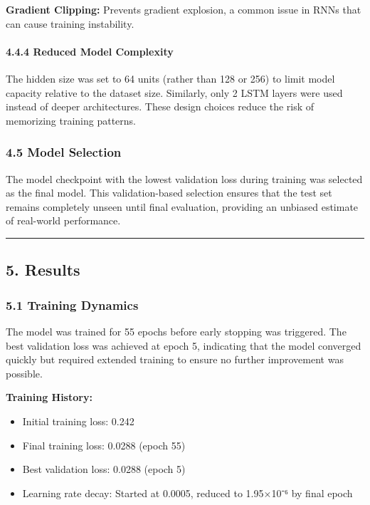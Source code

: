 \documentclass[
]{article}
\begin{document}
\textbf{Gradient Clipping:} Prevents gradient explosion, a common issue
in RNNs that can cause training instability.

\paragraph{4.4.4 Reduced Model
Complexity}\label{444-reduced-model-complexity}

The hidden size was set to 64 units (rather than 128 or 256) to limit
model capacity relative to the dataset size. Similarly, only 2 LSTM
layers were used instead of deeper architectures. These design choices
reduce the risk of memorizing training patterns.

\subsubsection{4.5 Model Selection}\label{45-model-selection}

The model checkpoint with the lowest validation loss during training was
selected as the final model. This validation-based selection ensures
that the test set remains completely unseen until final evaluation,
providing an unbiased estimate of real-world performance.

\begin{center}\rule{0.5\linewidth}{0.5pt}\end{center}

\subsection{5. Results}\label{5-results}

\subsubsection{5.1 Training Dynamics}\label{51-training-dynamics}

The model was trained for 55 epochs before early stopping was triggered.
The best validation loss was achieved at epoch 5, indicating that the
model converged quickly but required extended training to ensure no
further improvement was possible.

\textbf{Training History:}

\begin{itemize}
\item
  Initial training loss: 0.242
\item
  Final training loss: 0.0288 (epoch 55)
\item
  Best validation loss: 0.0288 (epoch 5)
\item
  Learning rate decay: Started at 0.0005, reduced to 1.95×10⁻⁶ by final
  epoch
\end{itemize}
\end{document}
